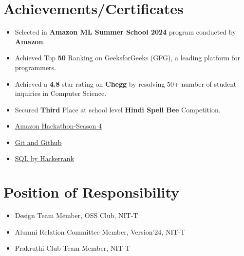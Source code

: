 \documentclass[letterpaper,11pt]{article}
\newcommand{\resumeItem}[1]{
  \item\small{
	{#1 \vspace{-1pt}}
  }
}
\newcommand{\resumeItemListStart}{\begin{itemize}[itemsep=2pt]}
\newcommand{\resumeItemListEnd}{\end{itemize}\vspace{0pt}}
\begin{document}
\section{\textbf{{\color{skyblue}   Achievements/Certificates}}}
 \begin{itemize}[leftmargin=0.05in, label={}]
	\resumeItemListStart
    	\resumeItem{Selected in \textbf{Amazon ML Summer School 2024} program conducted by \textbf{Amazon}.}
        \resumeItem{Achieved Top \textbf{50} Ranking on GeeksforGeeks (GFG), a leading platform for programmers.}
    	\resumeItem{Achieved a \textbf{4.8} star rating on \textbf{Chegg} by resolving 50+ number of student inquiries in Computer Science.}
        \resumeItem{Secured \textbf{Third} Place at school level \textbf{Hindi Spell Bee} Competition.}
        \resumeItem{\href{https://unstop.com/certificate-preview/a315e661-b913-4c96-8594-96ad80029b91?utm_campaign=site-emails}{\underline{Amazon Hackathon-Season 4}}}
    	\resumeItem{\href{https://coursera.org/share/b7ece2e1d759df8aca909a6aba069543}{\underline{Git and Github}}}
        \resumeItem{\href{https://www.hackerrank.com/certificates/your-certificate-id}{\underline{SQL by Hackerrank}}}
\resumeItemListEnd
 \end{itemize}
 \vspace{5pt}

\section{\textbf{{\color{skyblue} Position of Responsibility}}}
 \begin{itemize}[leftmargin=0.15in, label={}]
	\resumeItemListStart
    	\resumeItem{Design Team Member, OSS Club, NIT-T}
    	\resumeItem{Alumni Relation Committee Member, Version'24, NIT-T}
    	\resumeItem{Prakruthi Club Team Member, NIT-T}
  	\resumeItemListEnd
 \end{itemize}
\end{document}
